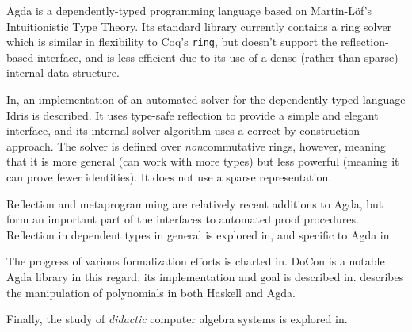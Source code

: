 \documentclass[draft, twocolumn]{article}
\theoremstyle{definition}
\theoremstyle{definition}
\begin{document}
Agda\cite{norell_dependently_2008} is a dependently-typed programming language
based on Martin-Löf's Intuitionistic Type
Theory\cite{martin-lof_intuitionistic_1980}. Its standard
library\cite{danielsson_agda_2018} currently contains a ring solver which is
similar in flexibility to Coq's \verb+ring+, but doesn't support the
reflection-based interface, and is less efficient due to its use of a dense
(rather than sparse) internal data structure.

In\cite{geuvers_automatically_2017}, an implementation of an automated solver
for the dependently-typed language Idris\cite{brady_idris_2013} is described. It
uses type-safe reflection to provide a simple and elegant interface, and its
internal solver algorithm uses a correct-by-construction approach. The solver is
defined over \emph{non}commutative rings, however, meaning that it is more
general (can work with more types) but less powerful (meaning it can prove fewer
identities). It does not use a sparse representation.

Reflection and metaprogramming are relatively recent additions to Agda, but form
an important part of the interfaces to automated proof procedures. Reflection in
dependent types in general is explored in\cite{christiansen_practical_2015}, and
specific to Agda in\cite{van_der_walt_reflection_2012}.

The progress of various formalization efforts is charted
in\cite{wiedijk_formalizing_2018}. DoCon\cite{meshveliani_docon-provable_2018}
is a notable Agda library in this regard: its implementation and goal is
described in\cite{meshveliani_dependent_2013}. \cite{cheng_functional_2018}
describes the manipulation of polynomials in both Haskell and Agda.

Finally, the study of \emph{didactic} computer algebra systems is explored
in\cite{lioubartsev_constructing_2016}.
\end{document}

